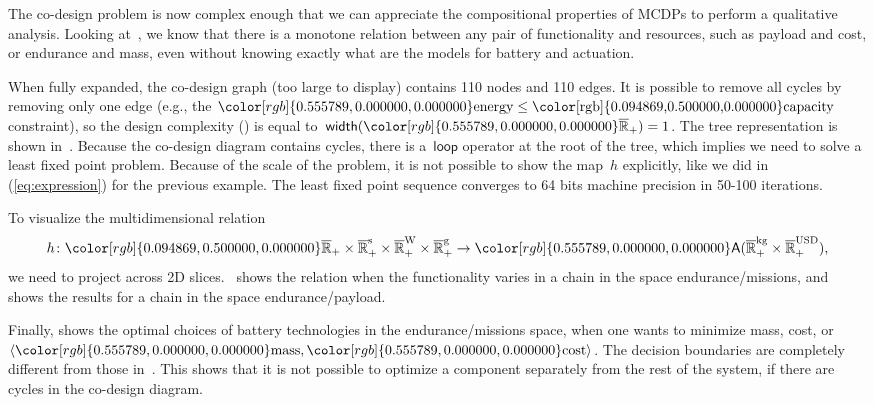 \documentclass[twocolumn,english]{IEEEtran}
\theoremstyle{definition}
\theoremstyle{plain}
\theoremstyle{definition}
\theoremstyle{remark}
\theoremstyle{definition}
\theoremstyle{plain}
\theoremstyle{plain}
\newcommand{\aword}[1]{\mathsf{#1}}
\newcommand{\vmath}[1]{\aword{#1}}
\newcommand{\antichains}{\vmath{A}}
\newcommand{\posetwidth}{\vmath{width}}
\newcommand{\ftor}{{h}}
\newcommand{\Rcomp}{\overline{\mathbb{R}}_+}
\newcommand{\dploop}{\vmath{loop}}
\newcommand{\colR}{\color[rgb]{0.555789,0.000000,0.000000}}
\newcommand{\colF}{\color[rgb]{0.094869,0.500000,0.000000}}
\newcommand{\R}[1]{{\colR #1}}
\newcommand{\F}[1]{{\colF #1}}
\begin{document}
The co-design problem is now complex enough that we can appreciate
the compositional properties of MCDPs to perform a qualitative analysis.
Looking at~, we know that there is a monotone relation
between any pair of functionality and resources, such as \F{payload}
and \R{cost}, or \F{endurance} and \R{mass}, even without knowing
exactly what are the models for battery and actuation.

When fully expanded, the co-design graph (too large to display) contains
110 nodes and 110 edges. It is possible to remove all cycles by removing
only one edge (e.g., the $\R{\text{energy}}\leq\text{\F{\text{capacity}}}$
constraint), so the design complexity ()
is equal to~$\posetwidth(\R{\overline{\mathbb{R}}_{+}})=1$. The
tree representation is shown in~. Because the
co-design diagram contains cycles, there is a~$\dploop$ operator
at the root of the tree, which implies we need to solve a least fixed
point problem. Because of the scale of the problem, it is not possible
to show the map~$\ftor$ explicitly, like we did in (\ref{eq:expression})
for the previous example. The least fixed point sequence converges
to 64 bits machine precision in 50-100 iterations.

To visualize the multidimensional relation
\[
\ftor\colon\F{\Rcomp\times\Rcomp^{\text{s}}\times\Rcomp^{\text{W}}\times\Rcomp^{\text{g}}}\rightarrow\R{\antichains(\Rcomp^{\text{kg}}\times\Rcomp^{\text{USD}})},
\]
we need to project across 2D slices. ~shows
the relation when the functionality varies in a chain in the space
\F{endurance}/\F{missions}, and~
shows the results for a chain in the space \F{endurance}/\F{payload}.

Finally,  shows the optimal choices of battery
technologies in the \F{endurance}/\F{missions} space, when one
wants to minimize \R{mass}, \R{cost}, or~$\left\langle \R{\text{mass}},\R{\text{cost}}\right\rangle $.
The decision boundaries are completely different from those in~.
This shows that it is not possible to optimize a component separately
from the rest of the system, if there are cycles in the co-design
diagram.
\end{document}
